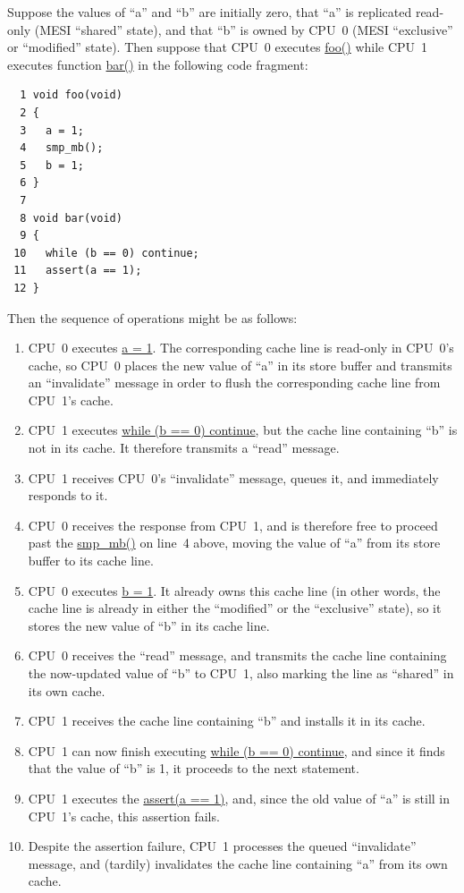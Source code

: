 Suppose the values of ``a'' and ``b'' are initially zero,
that ``a'' is replicated read-only (MESI ``shared'' state),
and that ``b''
is owned by CPU~0 (MESI ``exclusive'' or ``modified'' state).
Then suppose that CPU~0 executes \url{foo()} while CPU~1 executes
function \url{bar()} in the following code fragment:

\vspace{5pt}
\begin{minipage}[t]{\columnwidth}
\small
\begin{verbatim}
  1 void foo(void)
  2 {
  3   a = 1;
  4   smp_mb();
  5   b = 1;
  6 }
  7
  8 void bar(void)
  9 {
 10   while (b == 0) continue;
 11   assert(a == 1);
 12 }
\end{verbatim}
\end{minipage}
\vspace{5pt}

Then the sequence of operations might be as follows:
\begin{enumerate}
\item	CPU~0 executes \url{a = 1}.  The corresponding
	cache line is read-only in
	CPU~0's cache, so CPU~0 places the new value of ``a'' in its
	store buffer and transmits an ``invalidate'' message in order
	to flush the corresponding cache line from CPU~1's cache.
\item	CPU~1 executes \url{while (b == 0) continue}, but the cache line
	containing ``b'' is not in its cache.
	It therefore transmits a ``read'' message.
\item	CPU~1 receives CPU~0's ``invalidate'' message, queues it, and
	immediately responds to it.
\item	CPU~0 receives the response from CPU~1, and is therefore free
	to proceed past the \url{smp_mb()} on line~4 above, moving
	the value of ``a'' from its store buffer to its cache line.
\item	CPU~0 executes \url{b = 1}.
	It already owns this cache line (in other words, the cache line
	is already in either the ``modified'' or the ``exclusive'' state),
	so it stores the new value of ``b'' in its cache line.
\item	CPU~0 receives the ``read'' message, and transmits the
	cache line containing the now-updated value of ``b''
	to CPU~1, also marking the line as ``shared'' in its own cache.
\item	CPU~1 receives the cache line containing ``b'' and installs
	it in its cache.
\item	CPU~1 can now finish executing \url{while (b == 0) continue},
	and since it finds that the value of ``b'' is 1, it proceeds
	to the next statement.
\item	CPU~1 executes the \url{assert(a == 1)}, and, since the
	old value of ``a'' is still in CPU~1's cache,
	this assertion fails.
\item	Despite the assertion failure, CPU~1 processes the queued
	``invalidate'' message, and (tardily)
	invalidates the cache line containing ``a'' from its own cache.
\end{enumerate}


